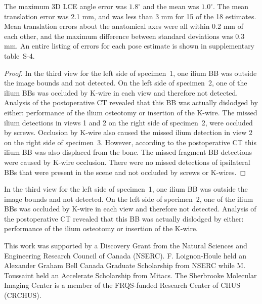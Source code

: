 \documentclass[demo]{OUP-EJ}
\begin{document}
\begin{proposition}
The maximum 3D LCE angle error was $1.8^{\circ}$ and the mean was $1.0^{\circ}$.
The mean translation error was 2.1 mm, and was less than 3 mm for 15 of the 18 estimates.
Mean translation errors about the anatomical axes were all within 0.2 mm of each other, and the maximum difference between standard deviations was 0.3 mm.
An entire listing of errors for each pose estimate is shown in supplementary table~S-4.
\end{proposition}


\begin{proof}
In the third view for the left side of specimen~1, one ilium BB was outside the image bounds and not detected.
On the left side of specimen~2, one of the ilium BBs was occluded by K-wire in each view and therefore not detected.
Analysis of the postoperative CT revealed that this BB was actually dislodged by either: performance of the ilium osteotomy or insertion of the K-wire.
The missed ilium detections in views 1 and 2 on the right side of specimen~2, were occluded by screws.
Occlusion by K-wire also caused the missed ilium detection in view 2 on the right side of specimen~3.
However, according to the postoperative CT this ilium BB was also displaced from the bone.
The missed fragment BB detections were caused by K-wire occlusion.
There were no missed detections of ipsilateral BBs that were present in the scene and not occluded by screws or K-wires.
\end{proof}

\begin{remark}
In the third view for the left side of specimen~1, one ilium BB was outside the image bounds and not detected.
On the left side of specimen~2, one of the ilium BBs was occluded by K-wire in each view and therefore not detected.
Analysis of the postoperative CT revealed that this BB was actually dislodged by either: performance of the ilium osteotomy or insertion of the K-wire.
\end{remark}

\begin{ack}
This work was supported by a Discovery Grant from the Natural Sciences and Engineering Research Council of Canada (NSERC). F. Loignon-Houle held an Alexander Graham Bell Canada Graduate Scholarship from NSERC while M. Toussaint held an Accelerate Scholarship from Mitacs. The Sherbrooke Molecular Imaging Center is a member of the FRQS-funded Research Center of CHUS (CRCHUS).
\end{ack}
\end{document}
